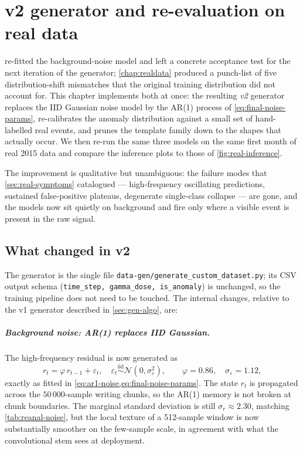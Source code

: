 \chapter{v2 generator and re-evaluation on real data}
\label{chap:v2}

 re-fitted the background-noise model and left a
concrete acceptance test for the next iteration of the generator;
\cref{chap:realdata} produced a punch-list of five distribution-shift
mismatches that the original training distribution did not account for.
This chapter implements both at once: the resulting \emph{v2} generator
replaces the IID Gaussian noise model by the AR(1) process of
\cref{eq:final-noise-params}, re-calibrates the anomaly distribution
against a small set of hand-labelled real events, and prunes the
template family down to the shapes that actually occur. We then re-run
the same three models on the same first month of real 2015 data and
compare the inference plots to those of \cref{fig:real-inference}.

The improvement is qualitative but unambiguous: the failure modes that
\cref{sec:real-symptoms} catalogued --- high-frequency oscillating
predictions, sustained false-positive plateaus, degenerate single-class
collapse --- are gone, and the models now sit quietly on background and
fire only where a visible event is present in the raw signal.

\section{What changed in v2}
\label{sec:v2-changes}

The generator is the single file
\texttt{data-gen/generate\_custom\_dataset.py}; its CSV output schema
(\texttt{time\_step, gamma\_dose, is\_anomaly}) is unchanged, so the
training pipeline does not need to be touched. The internal changes,
relative to the v1 generator described in \cref{sec:gen-algo}, are:

\paragraph{Background noise: AR(1) replaces IID Gaussian.}
The high-frequency residual is now generated as
\begin{equation}
    r_t = \varphi\, r_{t-1} + \varepsilon_t,
    \quad \varepsilon_t \overset{\text{iid}}{\sim} \mathcal{N}(0, \sigma_\varepsilon^2),
    \qquad \varphi = 0.86, \quad \sigma_\varepsilon = 1.12,
\end{equation}
exactly as fitted in \cref{eq:ar1-noise,eq:final-noise-params}. The
state $r_t$ is propagated across the $50\,000$-sample writing chunks,
so the AR(1) memory is not broken at chunk boundaries. The marginal
standard deviation is still $\sigma_r \approx 2.30$, matching
\cref{tab:reanal-noise}, but the local texture of a 512-sample window
is now substantially smoother on the few-sample scale, in agreement
with what the convolutional stem sees at deployment.

